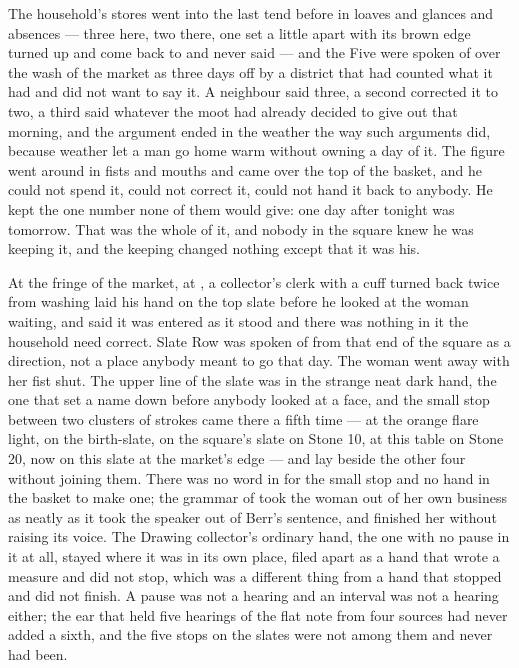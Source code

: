 The household's stores went into the last tend before  in loaves and glances and absences --- three here, two there, one set a little apart with its brown edge turned up and come back to and never said --- and the Five were spoken of over the wash of the market as three days off by a district that had counted what it had and did not want to say it. A neighbour said three, a second corrected it to two, a third said whatever the moot had already decided to give out that morning, and the argument ended in the weather the way such arguments did, because weather let a man go home warm without owning a day of it. The figure went around in fists and mouths and came over the top of the basket, and he could not spend it, could not correct it, could not hand it back to anybody. He kept the one number none of them would give: one day after tonight was tomorrow. That was the whole of it, and nobody in the square knew he was keeping it, and the keeping changed nothing except that it was his.

At the fringe of the market, at , a collector's clerk with a cuff turned back twice from washing laid his hand on the top slate before he looked at the woman waiting, and said it was entered as it stood and there was nothing in it the household need correct. Slate Row was spoken of from that end of the square as a direction, not a place anybody meant to go that day. The woman went away with her fist shut. The upper line of the slate was in the strange neat dark hand, the one that set a name down before anybody looked at a face, and the small stop between two clusters of strokes came there a fifth time --- at the orange flare light, on the birth-slate, on the square's slate on Stone 10, at this table on Stone 20, now on this slate at the market's edge --- and lay beside the other four without joining them. There was no word in  for the small stop and no hand in the basket to make one; the grammar of  took the woman out of her own business as neatly as it took the speaker out of Berr's sentence, and finished her without raising its voice. The Drawing collector's ordinary hand, the one with no pause in it at all, stayed where it was in its own place, filed apart as a hand that wrote a measure and did not stop, which was a different thing from a hand that stopped and did not finish. A pause was not a hearing and an interval was not a hearing either; the ear that held five hearings of the flat note from four sources had never added a sixth, and the five stops on the slates were not among them and never had been.


